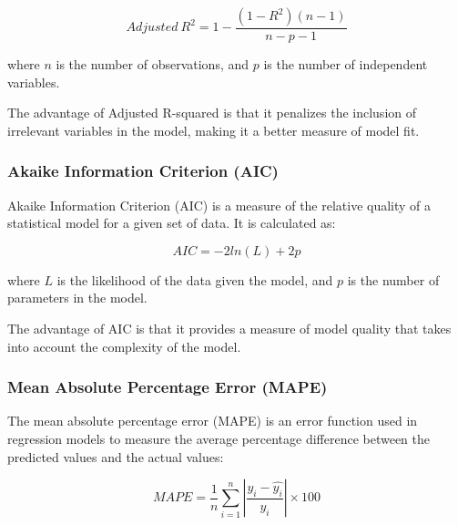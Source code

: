 \documentclass{article}
\begin{document}
\begin{equation}
Adjusted \ R^2 = 1 - \frac{(1 - R^2)(n - 1)}{n - p - 1}
\end{equation}

where $n$ is the number of observations, and $p$ is the number of independent variables.

The advantage of Adjusted R-squared is that it penalizes the inclusion of irrelevant variables in the model, making it a better measure of model fit.

\subsubsection{Akaike Information Criterion (AIC)}

Akaike Information Criterion (AIC) is a measure of the relative quality of a statistical model for a given set of data. It is calculated as:

\begin{equation}
AIC = -2ln(L) + 2p
\end{equation}

where $L$ is the likelihood of the data given the model, and $p$ is the number of parameters in the model.

The advantage of AIC is that it provides a measure of model quality that takes into account the complexity of the model.

\subsubsection{Mean Absolute Percentage Error (MAPE)}
\begin{center}
    \end{center}
The mean absolute percentage error (MAPE) is an error function used in regression models to measure the average percentage difference between the predicted values and the actual values:

\begin{equation}
MAPE = \frac{1}{n}\sum_{i=1}^{n} \left| \frac{y_i - \hat{y_i}}{y_i} \right| \times 100%
\end{equation}
\end{document}

